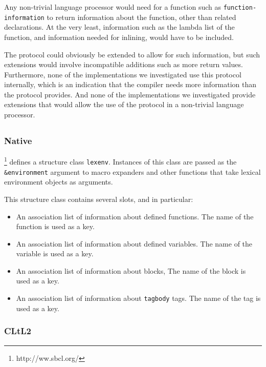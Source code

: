 Any non-trivial language processor would need for a function such as
\texttt{function-information} to return information about the
function, other than related declarations.  At the very least,
information such as the lambda list of the function, and information
needed for inlining, would have to be included.

The protocol could obviously be extended to allow for such
information, but such extensions would involve incompatible additions
such as more return values.  Furthermore, none of the \commonlisp{}
implementations we investigated use this protocol internally, which is
an indication that the compiler needs more information than the
protocol provides.  And none of the implementations we investigated
provide extensions that would allow the use of the protocol in
a non-trivial language processor.

\subsection{\sbcl{}}

\subsubsection{Native}

\sbcl{}%
\footnote{http://ww.sbcl.org/}
defines a structure class \texttt{lexenv}.  Instances of
this class are passed as the \texttt{\&environment} argument to macro
expanders and other functions that take lexical environment objects as
arguments.

This structure class contains several slots, and in particular:
\begin{itemize}
\item An association list of information about defined functions.
  The name of the function is used as a key.
\item An association list of information about defined variables.
  The name of the variable is used as a key.
\item An association list of information about blocks,
  The name of the block is used as a key.
\item An association list of information about \texttt{tagbody} tags.
  The name of the tag is used as a key.
\end{itemize}

\subsubsection{CLtL2}

